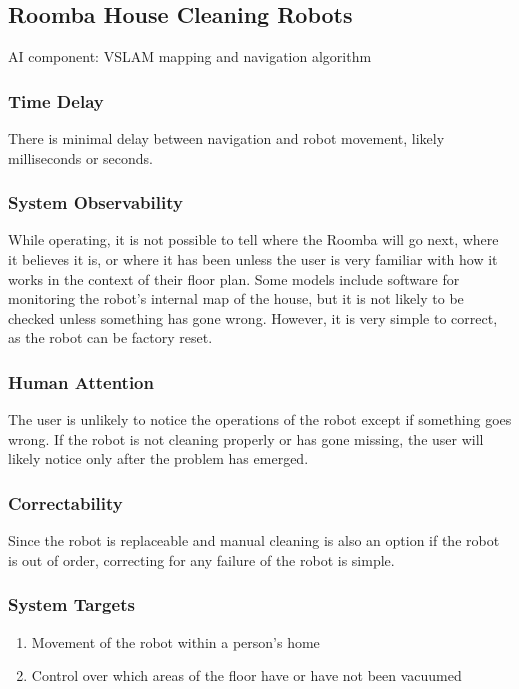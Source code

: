 \documentclass[11pt]{article}
\begin{document}
\subsection{Roomba House Cleaning Robots}

AI component: VSLAM mapping and navigation algorithm

\subsubsection*{Time Delay}

There is minimal delay between navigation and robot movement, likely milliseconds or seconds.

\subsubsection*{System Observability}

While operating, it is not possible to tell where the Roomba will go next,
where it believes it is, or where it has been unless the user is very familiar with how it works in
the context of their floor plan. Some models include software for monitoring the robot's internal
map of the house, but it is not likely to be checked unless something has gone wrong. However, it is
very simple to correct, as the robot can be factory reset.

\subsubsection*{Human Attention}

The user is unlikely to notice the operations of the robot except if something goes wrong. If the
robot is not cleaning properly or has gone missing, the user will likely notice only after the
problem has emerged.

\subsubsection*{Correctability}

Since the robot is replaceable and manual cleaning is also an option if the robot is out of order,
correcting for any failure of the robot is simple.

\subsubsection*{System Targets} 

\begin{enumerate} 
\item Movement of the robot within a person's home
\item Control over which areas of the floor have or have not been vacuumed
\end{enumerate}
\end{document}
